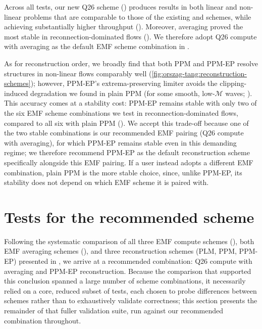 Across all tests, our new Q26 scheme () produces results in both linear and non-linear problems that are comparable to those of the existing  and  schemes, while achieving substantially higher throughput (). Moreover,  averaging proved the most stable in reconnection-dominated flows (). We therefore adopt Q26 compute with  averaging as the default EMF scheme combination in \quokka.

As for reconstruction order, we broadly find that both PPM and PPM-EP resolve structures in non-linear flows comparably well (\cref{fig:orszag-tang:reconstruction-schemes}); however, PPM-EP's extrema-preserving limiter avoids the clipping-induced degradation we found in plain PPM (for some smooth, low-$\mathcal{M}$ waves; ). This accuracy comes at a stability cost: PPM-EP remains stable with only two of the six EMF scheme combinations we test in reconnection-dominated flows, compared to all six with plain PPM (). We accept this trade-off because one of the two stable combinations is our recommended EMF pairing (Q26 compute with  averaging), for which PPM-EP remains stable even in this demanding regime; we therefore recommend PPM-EP as the default reconstruction scheme specifically alongside this EMF pairing. If a user instead adopts a different EMF combination, plain PPM is the more stable choice, since, unlike PPM-EP, its stability does not depend on which EMF scheme it is paired with.


\section{Tests for the recommended scheme}
\label{sec:stress-tests}

Following the systematic comparison of all three EMF compute schemes (), both EMF averaging schemes (), and three reconstruction schemes (PLM, PPM, PPM-EP) presented in , we arrive at a recommended combination: Q26 compute with  averaging and PPM-EP reconstruction. Because the comparison that supported this conclusion spanned a large number of scheme combinations, it necessarily relied on a core, reduced subset of tests, each chosen to probe differences between schemes rather than to exhaustively validate correctness; this section presents the remainder of that fuller validation suite, run against our recommended combination throughout.

